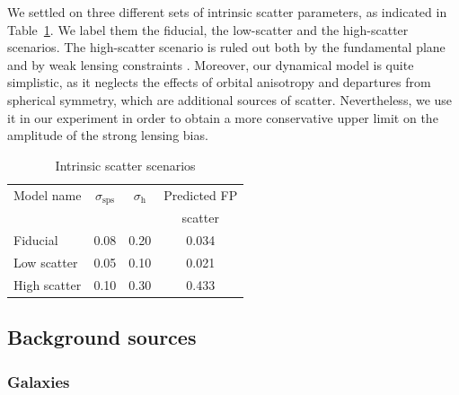 \documentclass{aa}
\def\Tref#1{Table~\ref{#1}\xspace}
\begin{document}
We settled on three different sets of intrinsic scatter parameters, as indicated in \Tref{tab:scatter}. We label them the fiducial, the low-scatter and the high-scatter scenarios.
The high-scatter scenario is ruled out both by the fundamental plane and by weak lensing constraints \citep{Son++22}. 
Moreover, our dynamical model is quite simplistic, as it neglects the effects of orbital anisotropy and departures from spherical symmetry, which are additional sources of scatter. 
Nevertheless, we use it in our experiment in order to obtain a more conservative upper limit on the amplitude of the strong lensing bias.
\begin{table}
\caption{Intrinsic scatter scenarios}
\label{tab:scatter}
\begin{tabular}{lccc}
\hline
\hline
Model name & $\sigma_{\mathrm{sps}}$ & $\sigma_{\mathrm{h}}$ & Predicted FP \\
 & & & scatter \\
\hline
Fiducial & 0.08 & 0.20 & 0.034 \\
Low scatter & 0.05 & 0.10 & 0.021 \\
High scatter & 0.10 & 0.30 & 0.433 \\
\end{tabular}
\end{table}

\subsection{Background sources}\label{ssec:sources}

\subsubsection{Galaxies}\label{ssub:extsources}
\end{document}
